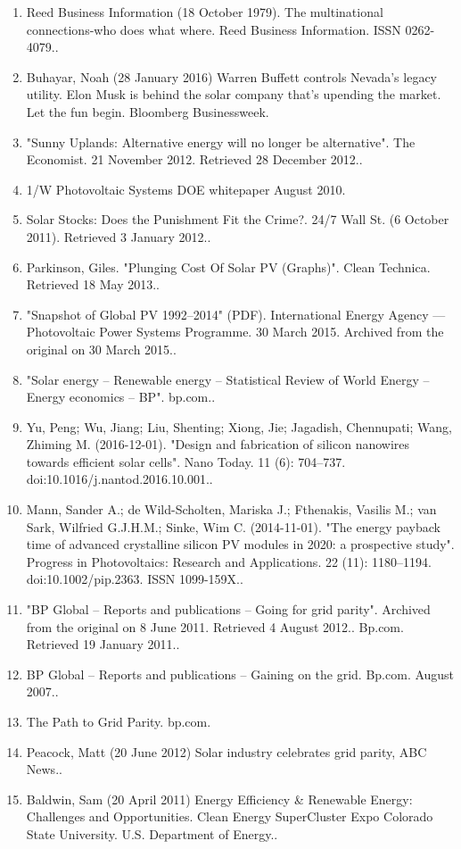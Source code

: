 \begin{enumerate}
\item Reed Business Information (18 October 1979). The multinational connections-who does what where. Reed Business Information. ISSN 0262-4079..
\item Buhayar, Noah (28 January 2016) Warren Buffett controls Nevada’s legacy utility. Elon Musk is behind the solar company that’s upending the market. Let the fun begin. Bloomberg Businessweek.
\item "Sunny Uplands: Alternative energy will no longer be alternative". The Economist. 21 November 2012. Retrieved 28 December 2012..
\item 1/W Photovoltaic Systems DOE whitepaper August 2010.
\item Solar Stocks: Does the Punishment Fit the Crime?. 24/7 Wall St. (6 October 2011). Retrieved 3 January 2012..
\item Parkinson, Giles. "Plunging Cost Of Solar PV (Graphs)". Clean Technica. Retrieved 18 May 2013..
\item "Snapshot of Global PV 1992–2014" (PDF). International Energy Agency — Photovoltaic Power Systems Programme. 30 March 2015. Archived from the original on 30 March 2015..
\item "Solar energy – Renewable energy – Statistical Review of World Energy – Energy economics – BP". bp.com..
\item Yu, Peng; Wu, Jiang; Liu, Shenting; Xiong, Jie; Jagadish, Chennupati; Wang, Zhiming M. (2016-12-01). "Design and fabrication of silicon nanowires towards efficient solar cells". Nano Today. 11 (6): 704–737. doi:10.1016/j.nantod.2016.10.001..
\item Mann, Sander A.; de Wild-Scholten, Mariska J.; Fthenakis, Vasilis M.; van Sark, Wilfried G.J.H.M.; Sinke, Wim C. (2014-11-01). "The energy payback time of advanced crystalline silicon PV modules in 2020: a prospective study". Progress in Photovoltaics: Research and Applications. 22 (11): 1180–1194. doi:10.1002/pip.2363. ISSN 1099-159X..
\item "BP Global – Reports and publications – Going for grid parity". Archived from the original on 8 June 2011. Retrieved 4 August 2012.. Bp.com. Retrieved 19 January 2011..
\item BP Global – Reports and publications – Gaining on the grid. Bp.com. August 2007..
\item The Path to Grid Parity. bp.com.
\item Peacock, Matt (20 June 2012) Solar industry celebrates grid parity, ABC News..
\item Baldwin, Sam (20 April 2011) Energy Efficiency & Renewable Energy: Challenges and Opportunities. Clean Energy SuperCluster Expo Colorado State University. U.S. Department of Energy..

\end{enumerate}
